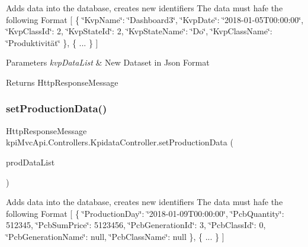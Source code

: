 Adds data into the database, creates new identifiers The data must hafe the following Format \mbox{[} \{ \char`\"{}\+Kvp\+Name\char`\"{}\+: \char`\"{}\+Dashboard3\char`\"{}, \char`\"{}\+Kvp\+Date\char`\"{}\+: \char`\"{}2018-\/01-\/05\+T00\+:00\+:00\char`\"{}, \char`\"{}\+Kvp\+Class\+Id\char`\"{}\+: 2, \char`\"{}\+Kvp\+State\+Id\char`\"{}\+: 2, \char`\"{}\+Kvp\+State\+Name\char`\"{}\+: \char`\"{}\+Do\char`\"{}, \char`\"{}\+Kvp\+Class\+Name\char`\"{}\+: \char`\"{}\+Produktivität\char`\"{} \}, \{ ... \} \mbox{]} 


\begin{DoxyParams}{Parameters}
{\em kvp\+Data\+List} & New Dataset in Json Format \\
\hline
\end{DoxyParams}
\begin{DoxyReturn}{Returns}
{\ttfamily Http\+Response\+Message} 
\end{DoxyReturn}
\mbox{\label{classkpi_mvc_api_1_1_controllers_1_1_kpidata_controller_a7f6c6c359f37a9b9a83d481b5c26a037}} 
\subsubsection{\texorpdfstring{set\+Production\+Data()}{setProductionData()}\hspace{0.1cm}{\footnotesize\ttfamily [1/2]}}
{\footnotesize\ttfamily Http\+Response\+Message kpi\+Mvc\+Api.\+Controllers.\+Kpidata\+Controller.\+set\+Production\+Data (\begin{DoxyParamCaption}\item[{List$<$ \hyperlink{classkpi_mvc_api_1_1_data_transfer_objects_1_1_production_data_dto}{Production\+Data\+Dto} $>$}]{prod\+Data\+List }\end{DoxyParamCaption})\hspace{0.3cm}{\ttfamily [inline]}}



Adds data into the database, creates new identifiers The data must hafe the following Format \mbox{[} \{ \char`\"{}\+Production\+Day\char`\"{}\+: \char`\"{}2018-\/01-\/09\+T00\+:00\+:00\char`\"{}, \char`\"{}\+Pcb\+Quantity\char`\"{}\+: 512345, \char`\"{}\+Pcb\+Sum\+Price\char`\"{}\+: 5123456, \char`\"{}\+Pcb\+Generation\+Id\char`\"{}\+: 3, \char`\"{}\+Pcb\+Class\+Id\char`\"{}\+: 0, \char`\"{}\+Pcb\+Generation\+Name\char`\"{}\+: null, \char`\"{}\+Pcb\+Class\+Name\char`\"{}\+: null \}, \{ ... \} \mbox{]} 


